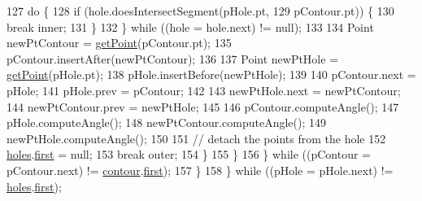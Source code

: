 \begin{DoxyCode}
127                                 \textcolor{keywordflow}{do} \{
128                                     \textcolor{keywordflow}{if} (hole.doesIntersectSegment(pHole.pt,
129                                             pContour.pt)) \{
130                                         \textcolor{keywordflow}{break} inner;
131                                     \}
132                                 \} \textcolor{keywordflow}{while} ((hole = hole.next) != null);
133 
134                                 Point newPtContour = \mbox{\hyperlink{classorg_1_1newdawn_1_1slick_1_1geom_1_1_mann_triangulator_aaeb702ea8e30747148abb637eb7cc342}{getPoint}}(pContour.pt);
135                                 pContour.insertAfter(newPtContour);
136 
137                                 Point newPtHole = \mbox{\hyperlink{classorg_1_1newdawn_1_1slick_1_1geom_1_1_mann_triangulator_aaeb702ea8e30747148abb637eb7cc342}{getPoint}}(pHole.pt);
138                                 pHole.insertBefore(newPtHole);
139 
140                                 pContour.next = pHole;
141                                 pHole.prev = pContour;
142 
143                                 newPtHole.next = newPtContour;
144                                 newPtContour.prev = newPtHole;
145 
146                                 pContour.computeAngle();
147                                 pHole.computeAngle();
148                                 newPtContour.computeAngle();
149                                 newPtHole.computeAngle();
150 
151                                 \textcolor{comment}{// detach the points from the hole}
152                                 \mbox{\hyperlink{classorg_1_1newdawn_1_1slick_1_1geom_1_1_mann_triangulator_a52a9b8b72ebce44c620dbad2e8285540}{holes}}.\mbox{\hyperlink{classorg_1_1newdawn_1_1slick_1_1geom_1_1_mann_triangulator_1_1_point_bag_a120e5163711d94563be103af953fe059}{first}} = null;
153                                 \textcolor{keywordflow}{break} outer;
154                             \}
155                         \}
156                     \} \textcolor{keywordflow}{while} ((pContour = pContour.next) != \mbox{\hyperlink{classorg_1_1newdawn_1_1slick_1_1geom_1_1_mann_triangulator_a94eff0c5ad39ce0c232815591fe3f2d8}{contour}}.\mbox{\hyperlink{classorg_1_1newdawn_1_1slick_1_1geom_1_1_mann_triangulator_1_1_point_bag_a120e5163711d94563be103af953fe059}{first}});
157                 \}
158             \} \textcolor{keywordflow}{while} ((pHole = pHole.next) != \mbox{\hyperlink{classorg_1_1newdawn_1_1slick_1_1geom_1_1_mann_triangulator_a52a9b8b72ebce44c620dbad2e8285540}{holes}}.\mbox{\hyperlink{classorg_1_1newdawn_1_1slick_1_1geom_1_1_mann_triangulator_1_1_point_bag_a120e5163711d94563be103af953fe059}{first}});

\end{DoxyCode}
